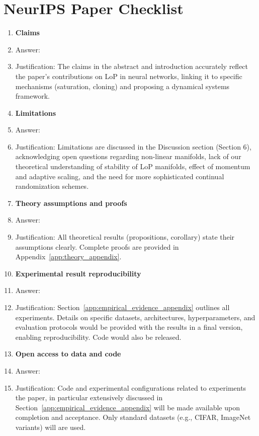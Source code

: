 \documentclass{article}
\numberwithin{figure}{section}
\begin{document}
\section*{NeurIPS Paper Checklist}
\begin{enumerate}
\item {\bf Claims}
    \item Answer: \answerYes{}
    \item Justification: The claims in the abstract and introduction accurately reflect the paper's contributions on LoP in neural networks, linking it to specific mechanisms (saturation, cloning) and proposing a dynamical systems framework.

\item {\bf Limitations}
    \item Answer: \answerYes{}
    \item Justification: Limitations are discussed in the Discussion section (Section 6), acknowledging open questions regarding non-linear manifolds, lack of our theoretical understanding of stability of LoP manifolds, effect of momentum and adaptive scaling, and the need for more sophisticated continual randomization schemes.

\item {\bf Theory assumptions and proofs}
    \item Answer: \answerYes{}
    \item Justification: All theoretical results (propositions, corollary) state their assumptions clearly. Complete proofs are provided in Appendix~\ref{app:theory_appendix}.

\item {\bf Experimental result reproducibility}
    \item Answer: \answerYes{} %
    \item Justification: Section~\ref{app:empirical_evidence_appendix} outlines all experiments. Details on specific datasets, architectures, hyperparameters, and evaluation protocols would be provided with the results in a final version, enabling reproducibility. Code would also be released.

\item {\bf Open access to data and code}
    \item Answer: \answerYes{} %
    \item Justification: Code and experimental configurations related to experiments the paper, in particular extensively discussed in Section~\ref{app:empirical_evidence_appendix} will be made available upon completion and acceptance. Only standard datasets (e.g., CIFAR, ImageNet variants) will are used.


\end{enumerate}
\end{document}
